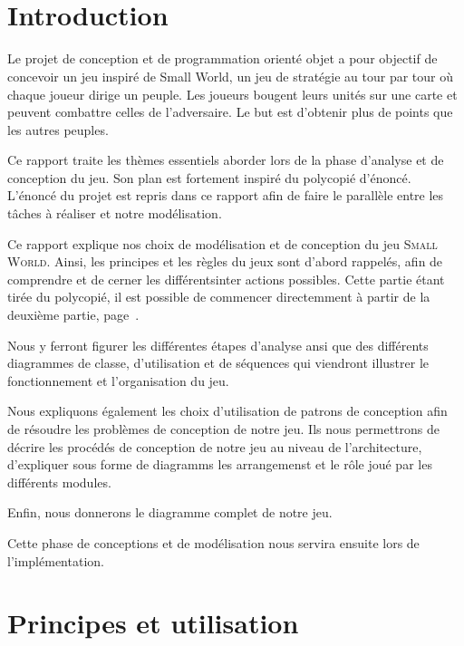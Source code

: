 \documentclass[a4paper]{article}%
\begin{document}


\newpage
\setcounter{page}{2}
~
\newpage

\tableofcontents

\newpage
~
\newpage

\section*{Introduction}

Le projet de conception et de programmation orienté objet a pour objectif de concevoir un jeu inspiré de Small World, un jeu de stratégie au tour par tour où chaque joueur dirige un peuple. Les joueurs bougent leurs unités sur une carte et peuvent combattre celles de l'adversaire. Le but est d'obtenir plus de points que les autres peuples.

\medskip

Ce rapport traite les thèmes essentiels aborder lors de la phase d'analyse et de conception du jeu. Son plan est fortement inspiré du polycopié d'énoncé. L'énoncé du projet est repris dans ce rapport afin de faire le parallèle entre les tâches à réaliser et notre modélisation. 

\medskip

Ce rapport explique nos choix de modélisation et de conception du jeu \textsc{Small World}.
Ainsi, les principes et les règles du jeux sont d'abord rappelés, afin de comprendre et de cerner les différentsinter actions possibles. Cette partie étant tirée du polycopié, il est possible de commencer directemment à partir de la deuxième partie, page~\pageref{debut}.

Nous y ferront figurer les différentes étapes d'analyse ansi que des différents diagrammes de classe, d'utilisation et de séquences qui viendront illustrer le fonctionnement et l'organisation du jeu.

Nous expliquons également les choix d'utilisation de patrons de conception afin de résoudre les problèmes de conception de notre jeu.
Ils nous permettrons de décrire les procédés de conception de notre jeu au niveau de l'architecture, d'expliquer sous forme de diagramms les arrangemenst et le rôle joué par les différents modules.

Enfin, nous donnerons le diagramme complet de notre jeu.

Cette phase de conceptions et de modélisation nous servira ensuite lors de l'implémentation.


\section{Principes et utilisation}
\end{document}
